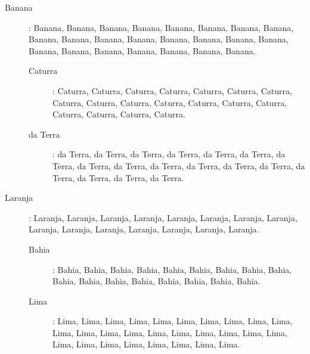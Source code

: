 \begin{description}

\item [Banana]: Banana, Banana, Banana, Banana, Banana, Banana, Banana, Banana, Banana, Banana, Banana, Banana, Banana, Banana, Banana, Banana, Banana, Banana, Banana, Banana, Banana, Banana, Banana.

\begin{description}

\item [Caturra]: Caturra, Caturra, Caturra, Caturra, Caturra, Caturra, Caturra, Caturra, Caturra, Caturra, Caturra, Caturra, Caturra, Caturra, Caturra, Caturra, Caturra, Caturra.

\item [da Terra]: da Terra, da Terra, da Terra, da Terra, da Terra, da Terra, da Terra, da Terra, da Terra, da Terra, da Terra, da Terra, da Terra, da Terra, da Terra, da Terra, da Terra.

\end{description}

\item [Laranja]: Laranja, Laranja, Laranja, Laranja, Laranja, Laranja, Laranja, Laranja, Laranja, Laranja, Laranja, Laranja, Laranja, Laranja, Laranja.

\begin{description}

\item [Bahia]: Bahia, Bahia, Bahia, Bahia, Bahia, Bahia, Bahia, Bahia, Bahia, Bahia, Bahia, Bahia, Bahia, Bahia, Bahia, Bahia, Bahia.

\item [Lima]: Lima, Lima, Lima, Lima, Lima, Lima, Lima, Lima, Lima, Lima, Lima, Lima, Lima, Lima, Lima, Lima, Lima, Lima, Lima, Lima, Lima, Lima, Lima, Lima, Lima, Lima, Lima, Lima.

\end{description}

\end{description}

